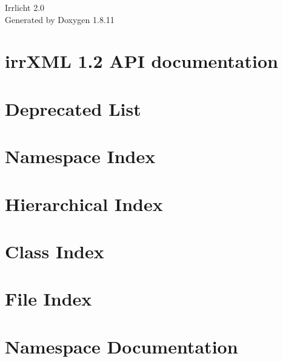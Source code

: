 \documentclass[twoside]{book}
\newcommand{\+}{\discretionary{\mbox{\scriptsize$\hookleftarrow$}}{}{}}
\newcommand{\clearemptydoublepage}{%
  \newpage{\pagestyle{empty}\cleardoublepage}%
}
\begin{document}
\hypersetup{pageanchor=false,
             bookmarksnumbered=true,
             pdfencoding=unicode
            }
\begin{titlepage}
\vspace*{7cm}
\begin{center}%
{\Large Irrlicht 2.0 }\\
\vspace*{1cm}
{\large Generated by Doxygen 1.8.11}\\
\end{center}
\end{titlepage}
\clearemptydoublepage
\tableofcontents
\clearemptydoublepage
{}
\hypersetup{pageanchor=true}

\chapter{irr\+X\+ML 1.2 A\+PI documentation}
\label{index}\hypertarget{index}{}
\chapter{Deprecated List}
\label{deprecated}
\hypertarget{deprecated}{}

\chapter{Namespace Index}

\chapter{Hierarchical Index}

\chapter{Class Index}

\chapter{File Index}

\chapter{Namespace Documentation}






\end{document}
